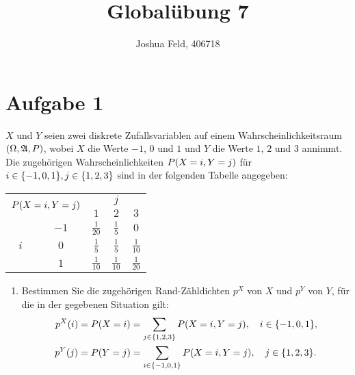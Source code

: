 \documentclass{exercise}
\institute{Institut für Statistik und Wirtschaftsmathematik}
\title{Globalübung 7}
\author{Joshua Feld, 406718}
\begin{document}
    \maketitle


    \section*{Aufgabe 1}
    
    \begin{problem}
        \(X\) und \(Y\) seien zwei diskrete Zufallsvariablen auf einem Wahrscheinlichkeitsraum \(\parentheses*{\Omega, \mathfrak{A}, P}\), wobei \(X\) die Werte \(-1\), \(0\) und \(1\) und \(Y\) die Werte \(1\), \(2\) und \(3\) annimmt.
        Die zugehörigen Wahrscheinlichkeiten \(P\parentheses*{X = i, Y = j}\) für \(i \in \braces*{-1, 0, 1}, j \in \braces*{1, 2, 3}\) sind in der folgenden Tabelle angegeben:
        \begin{center}
            \begin{tabular}{ccccc}
                \toprule
                \multicolumn{2}{c}{\multirow{2}{*}{\(P\parentheses*{X = i, Y = j}\)}} & \multicolumn{3}{c}{\(j\)}\\
                \multicolumn{2}{c}{\multirow{2}{*}{}} & \(1\) & \(2\) & \(3\)\\
                \midrule
                \multirow{3}{*}{\(i\)} & \(-1\) & \(\frac{1}{20}\) & \(\frac{1}{5}\) & \(0\)\\
                & \(0\) & \(\frac{1}{5}\) & \(\frac{1}{5}\) & \(\frac{1}{10}\)\\
                & \(1\) & \(\frac{1}{10}\) & \(\frac{1}{10}\) & \(\frac{1}{20}\)\\
                \bottomrule
            \end{tabular}
        \end{center}
        \begin{enumerate}
            \item Bestimmen Sie die zugehörigen Rand-Zähldichten \(p^X\) von \(X\) und \(p^Y\) von \(Y\), für die in der gegebenen Situation gilt:
            \begin{align*}
                p^X\parentheses*{i} &= P\parentheses*{X = i} = \sum_{j \in \braces*{1, 2, 3}}P\parentheses*{X = i, Y = j}, \quad i \in \braces*{-1, 0, 1},\\
                p^Y\parentheses*{j} &= P\parentheses*{Y = j} = \sum_{i \in \braces*{-1, 0, 1}}P\parentheses*{X = i, Y = j}, \quad j \in \braces*{1, 2, 3}.
            \end{align*}

\end{enumerate}
\end{problem}
\end{document}
